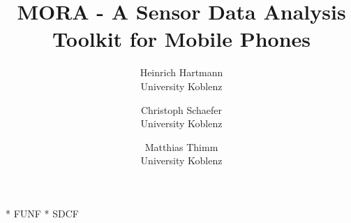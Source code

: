 \documentclass[times, 10pt,twocolumn]{article}
\begin{document}
\title{MORA - A Sensor Data Analysis Toolkit for Mobile Phones}

\author{Heinrich Hartmann\\
University Koblenz\\ %
\and
Christoph Schaefer \\
University Koblenz \\
\and
Matthias Thimm \\
University Koblenz \\
}

\maketitle
\thispagestyle{empty}

\begin{abstract}
\end{abstract}














* FUNF
* SDCF


\nocite{ex1,ex2}


\end{document}
